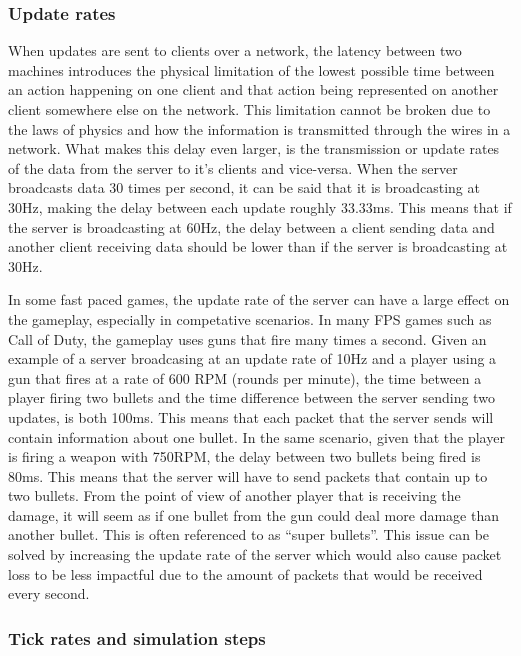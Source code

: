 \subsubsection{Update rates}
When updates are sent to clients over a network, the latency between two machines introduces the physical limitation of the lowest possible time between an action happening on one client and that action being represented on another client somewhere else on the network. This limitation cannot be broken due to the laws of physics and how the information is transmitted through the wires in a network. What makes this delay even larger, is the transmission or update rates of the data from the server to it's clients and vice-versa. When the server broadcasts data 30 times per second, it can be said that it is broadcasting at 30Hz, making the delay between each update roughly 33.33ms. This means that if the server is broadcasting at 60Hz, the delay between a client sending data and another client receiving data should be lower than if the server is broadcasting at 30Hz.

In some fast paced games, the update rate of the server can have a large effect on the gameplay, especially in competative scenarios. In many FPS games such as Call of Duty, the gameplay uses guns that fire many times a second. Given an example of a server broadcasing at an update rate of 10Hz and a player using a gun that fires at a rate of 600 RPM (rounds per minute), the time between a player firing two bullets and the time difference between the server sending two updates, is both 100ms. This means that each packet that the server sends will contain information about one bullet. In the same scenario, given that the player is firing a weapon with 750RPM, the delay between two bullets being fired is 80ms. This means that the server will have to send packets that contain up to two bullets. From the point of view of another player that is receiving the damage, it will seem as if one bullet from the gun could deal more damage than another bullet. This is often referenced to as ``super bullets''. This issue can be solved by increasing the update rate of the server which would also cause packet loss to be less impactful due to the amount of packets that would be received every second.

\subsubsection{Tick rates and simulation steps}




